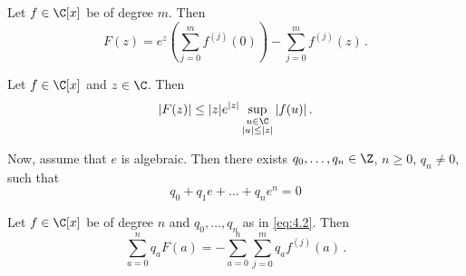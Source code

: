 \begin{lem}
	Let \( f \in \C[x] \) be of degree \( m \).
	Then
	\[ F(z) = e^z \left( \sum_{j=0}^{m} f^{(j)} (0) \right) - \sum_{j=0}^{m} f^{(j)} (z) \,. \]
\end{lem}

\begin{lem}
	Let \( f \in \C[x] \) and \( z \in \C \).
	Then
	\[ |F(z)| \leq |z| e^{|z|} \sup_{\substack{u \in \C\\|u| \leq |z|}} |f(u)| \,. \]
\end{lem}

Now, assume that \( e \) is algebraic.
Then there exists \( q_0, \dotsc, q_n \in \Z \), \( n \geq 0 \), \( q_n \neq 0 \), such that 
\begin{equation}
	\label{eq:4.2}
	q_0 + q_1 e + \dots + q_n e^n = 0
\end{equation}

\begin{lem}
	Let \( f \in \C[x] \) be of degree \( n \) and \( q_0, \dotsc, q_n \) as in \eqref{eq:4.2}.
	Then
	\begin{equation}
		\label{eq:4.3}
		\sum_{a=0}^{n} q_a F(a) = -\sum_{a=0}^{n} \sum_{j=0}^{m} q_a f^{(j)} (a) \,.
	\end{equation}
\end{lem}